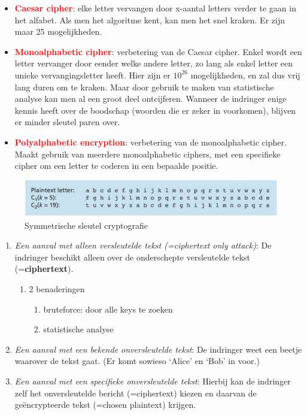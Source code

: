 \begin{itemize}
    \item \textcolor{red}{\textbf{Caesar cipher}}: elke letter vervangen door x-aantal letters verder te gaan in het alfabet. Als men het algoritme kent, kan men het snel kraken. Er zijn maar 25 mogelijkheden.
    \item \textcolor{red}{\textbf{Monoalphabetic cipher}}: verbetering van de Caesar cipher. Enkel wordt een letter vervanger door eender welke andere letter, zo lang als enkel letter een unieke vervangingsletter heeft. Hier zijn er $10^{26}$ mogelijkheden, en zal dus vrij lang duren om te kraken. Maar door gebruik te maken van statistische analyse kan men al een groot deel ontcijferen. Wanneer de indringer enige kennis heeft over de boodschap (woorden die er zeker in voorkomen), blijven er minder sleutel paren over.
    \item \textcolor{red}{\textbf{Polyalphabetic encryption}}: verbetering van de monoalphabetic cipher. Maakt gebruik van meerdere monoalphabetic ciphers, met een specifieke cipher om een letter te coderen in een bepaalde positie.
\end{itemize}

\begin{figure}[h]
    \centering
    \includegraphics[width=7in]{./img/imghfdst8/Figure8-4.PNG}
    \caption{Symmetrische sleutel cryptografie }      
    \label{fig:Symmetrische sleutel cryptografie }
\end{figure}

\newpage


\begin{enumerate}

\item \textit{Een aanval met alleen versleutelde tekst (=ciphertext only attack)}: De indringer beschikt alleen over de onderschepte versleutelde tekst (=\textbf{ciphertext}).
    \begin{enumerate}
\item 2 benaderingen
        \begin{enumerate}
\item bruteforce: door alle keys te zoeken
\item statistische analyse
        \end{enumerate}

    \end{enumerate}
\item \textit{Een aanval met een bekende onversleutelde tekst}: De indringer weet een beetje waarover de tekst gaat. (Er komt sowieso ‘Alice’ en ‘Bob’ in voor.)
\item \textit{Een aanval met een specifieke onversleutelde tekst}: Hierbij kan de indringer zelf het onversleutelde bericht (=ciphertext) kiezen en daarvan de geëncrypteerde tekst (=chosen plaintext) krijgen.
\end{enumerate}

